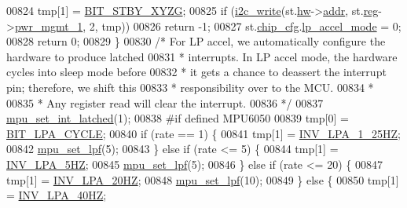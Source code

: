 \begin{DoxyCode}
{{{{00824         tmp[1] = \hyperlink{inv__mpu_8c_a4e2ef22b94b90f9b83394dfe1f688ce4}{BIT\_STBY\_XYZG};
00825         \textcolor{keywordflow}{if} (\hyperlink{_i2_c_8c_ac0f145afe8d662af199043939f4398d6}{i2c\_write}(st.\hyperlink{structgyro__state__s_a5bac30a96752691e4cc723735060e360}{hw}->\hyperlink{structhw__s_a4c34a946600e9d68b6355d23f54d291b}{addr}, st.\hyperlink{structgyro__state__s_ae857e1285c583b7438a208edd691a38e}{reg}->\hyperlink{structgyro__reg__s_ad746a196c317f0f4d557a92b9eb98d34}{pwr\_mgmt\_1}, 2, tmp))
00826             \textcolor{keywordflow}{return} -1;
00827         st.\hyperlink{structgyro__state__s_ac895217592e2084bd520b0be8e9d20ee}{chip\_cfg}.\hyperlink{structchip__cfg__s_aeb8fb45fc306b199be68b3f61940fbb0}{lp\_accel\_mode} = 0;
00828         \textcolor{keywordflow}{return} 0;
00829     \}
00830     \textcolor{comment}{/* For LP accel, we automatically configure the hardware to produce latched}
00831 \textcolor{comment}{     * interrupts. In LP accel mode, the hardware cycles into sleep mode before}
00832 \textcolor{comment}{     * it gets a chance to deassert the interrupt pin; therefore, we shift this}
00833 \textcolor{comment}{     * responsibility over to the MCU.}
00834 \textcolor{comment}{     *}
00835 \textcolor{comment}{     * Any register read will clear the interrupt.}
00836 \textcolor{comment}{     */}
00837     \hyperlink{group___d_r_i_v_e_r_s_ga653cb855300bff9285ce4b8dca6a503b}{mpu\_set\_int\_latched}(1);
00838 \textcolor{preprocessor}{#if defined MPU6050}
00839     tmp[0] = \hyperlink{inv__mpu_8c_a63e6f23af37626aa1498d8c248f259e7}{BIT\_LPA\_CYCLE};
00840     \textcolor{keywordflow}{if} (rate == 1) \{
00841         tmp[1] = \hyperlink{inv__mpu_8c_a23c3fcde795e5aa2b141232d490c9ca7ab44c7d0127a9466747853533a537b567}{INV\_LPA\_1\_25HZ};
00842         \hyperlink{group___d_r_i_v_e_r_s_ga5661a9dee25152166769910767a2a93d}{mpu\_set\_lpf}(5);
00843     \} \textcolor{keywordflow}{else} \textcolor{keywordflow}{if} (rate <= 5) \{
00844         tmp[1] = \hyperlink{inv__mpu_8c_a23c3fcde795e5aa2b141232d490c9ca7a474cac76bff369dd656cc973207a1ca5}{INV\_LPA\_5HZ};
00845         \hyperlink{group___d_r_i_v_e_r_s_ga5661a9dee25152166769910767a2a93d}{mpu\_set\_lpf}(5);
00846     \} \textcolor{keywordflow}{else} \textcolor{keywordflow}{if} (rate <= 20) \{
00847         tmp[1] = \hyperlink{inv__mpu_8c_a23c3fcde795e5aa2b141232d490c9ca7accaaf47c58dfe32cbf2ffa11fdb83108}{INV\_LPA\_20HZ};
00848         \hyperlink{group___d_r_i_v_e_r_s_ga5661a9dee25152166769910767a2a93d}{mpu\_set\_lpf}(10);
00849     \} \textcolor{keywordflow}{else} \{
00850         tmp[1] = \hyperlink{inv__mpu_8c_a23c3fcde795e5aa2b141232d490c9ca7a798d2b86eafcf3fc7c7fe775f46cb4cb}{INV\_LPA\_40HZ};
}}}}
\end{DoxyCode}
